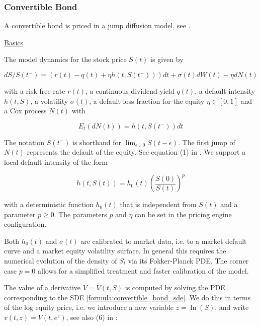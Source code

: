 \subsubsection{Convertible Bond}
\label{pricing::convertible_bond}

A convertible bond is priced in a jump diffusion model, see \cite{Andersen_Buffum_2002}.

\underline{Basics}

The model dynamics for the stock price $S(t)$ is given by

\begin{equation}\label{formula:convertible_bond_sde}
  dS / S(t^-) = (r(t) - q(t) + \eta h(t, S(t^-))) dt + \sigma(t) dW(t) - \eta dN(t)
\end{equation}

with a risk free rate $r(t)$, a continuous dividend yield $q(t)$, a default intensity $h(t,S)$, a volatility
$\sigma(t)$, a default loss fraction for the equity $\eta \in [0,1]$ and a Cox process $N(t)$ with

\begin{equation}
  E_t(dN(t)) = h(t,S(t^-)) dt
\end{equation}

The notation $S(t^-)$ is shorthand for $\lim_{\epsilon\downarrow 0} S(t-\epsilon)$. The first jump of $N(t)$ represents
the default of the equity. See equation (1) in \cite{Andersen_Buffum_2002}. We support a local default intensity of the
form

\begin{equation}
h(t,S(t)) = h_0(t) \left( \frac{S(0)}{S(t)} \right)^p
\end{equation}

with a deterministic function $h_0(t)$ that is independent from $S(t)$ and a parameter $p \geq 0$. The parameters $p$
and $\eta$ can be set in the pricing engine configuration.

Both $h_0(t)$ and $\sigma(t)$ are calibrated to market data, i.e. to a market default curve and a market equity
volatility surface. In general this requires the numerical evolution of the density of $S_t$ via its Fokker-Planck PDE.
The corner case $p=0$ allows for a simplified treatment and faster calibration of the model.

The value of a derivative $V = V(t,S)$ is computed by solving the PDE corresponding to the SDE
\ref{formula:convertible_bond_sde}. We do this in terms of the log equity price, i.e. we introduce a new variable
$z = \ln(S)$, and write $v(t,z) = V(t,e^z)$, see also (6) in \cite{Andersen_Buffum_2002}:

